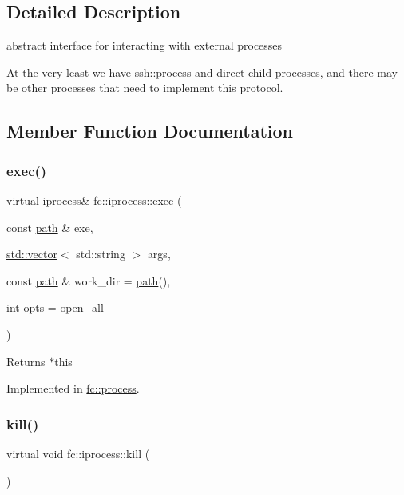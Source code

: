 \subsection{Detailed Description}
abstract interface for interacting with external processes 

At the very least we have ssh\+::process and direct child processes, and there may be other processes that need to implement this protocol. 

\subsection{Member Function Documentation}
\mbox{\label{classfc_1_1iprocess_a3f0415eda607b44ed96732c354f198e0}} 
\subsubsection{\texorpdfstring{exec()}{exec()}}
{\footnotesize\ttfamily virtual \mbox{\hyperlink{classfc_1_1iprocess}{iprocess}}\& fc\+::iprocess\+::exec (\begin{DoxyParamCaption}\item[{const \mbox{\hyperlink{classfc_1_1path}{path}} \&}]{exe,  }\item[{\mbox{\hyperlink{classstd_1_1vector}{std\+::vector}}$<$ std\+::string $>$}]{args,  }\item[{const \mbox{\hyperlink{classfc_1_1path}{path}} \&}]{work\+\_\+dir = {\ttfamily \mbox{\hyperlink{classfc_1_1path}{path}}()},  }\item[{int}]{opts = {\ttfamily open\+\_\+all} }\end{DoxyParamCaption})\hspace{0.3cm}{\ttfamily [pure virtual]}}

\begin{DoxyReturn}{Returns}
$\ast$this 
\end{DoxyReturn}


Implemented in \mbox{\hyperlink{classfc_1_1process_aa663b2fe8d58228224d0c1a954554a46}{fc\+::process}}.

\mbox{\label{classfc_1_1iprocess_ab8f2c418018f1722ae821334bfd6c0f8}} 
\subsubsection{\texorpdfstring{kill()}{kill()}}
{\footnotesize\ttfamily virtual void fc\+::iprocess\+::kill (\begin{DoxyParamCaption}{ }\end{DoxyParamCaption})\hspace{0.3cm}{\ttfamily [pure virtual]}}

